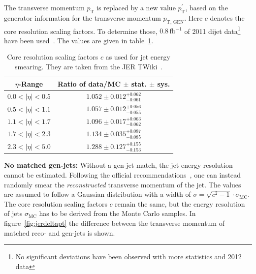 {\noindent The transverse momentum $p_{\text{T}}$ is replaced by a new value $p_{\text{T}}^\prime$, based on the generator information for the transverse momentum $p_{\text{T, GEN}}$. Here $c$ denotes the core resolution scaling factors. To determine those, $0.8\,\text{fb}^{-1}$ of 2011 dijet data\footnote{No significant deviations have been observed with more statistics and 2012 data} have been used~\cite{jer}. The values are given in table~\ref{tab:jerfactors}.

  \begin{table}[htbp!]
    \centering
    {\renewcommand{\arraystretch}{1.2}
      \begin{tabular}{|c|c|}
        \hline
        $\eta$-Range & Ratio of data/MC $\pm$ stat. $\pm$ sys. \\ \hline \hline
        $0.0 < |\eta| < 0.5$ & $1.052 \pm 0.012 ^{+0.062}_{-0.061}$ \\ \hline
        $0.5 < |\eta| < 1.1$ & $1.057 \pm 0.012 ^{+0.056}_{-0.055}$ \\ \hline
        $1.1 < |\eta| < 1.7$ & $1.096 \pm 0.017 ^{+0.063}_{-0.062}$ \\ \hline
        $1.7 < |\eta| < 2.3$ & $1.134 \pm 0.035 ^{+0.087}_{-0.085}$ \\ \hline
        $2.3 < |\eta| < 5.0$ & $1.288 \pm 0.127 ^{+0.155}_{-0.153}$ \\ \hline
      \end{tabular}
    }
    \caption{Core resolution scaling factors $c$ as used for jet energy smearing. They are taken from the JER TWiki~\cite{jer}.}
    \label{tab:jerfactors}
  \end{table}
  
\textbf{No matched gen-jets:} Without a gen-jet match, the jet energy resolution cannot be estimated. Following the official recommendations~\cite{jer}, one can instead randomly smear the \textit{reconstructed} transverse momentum of the jet. The values are assumed to follow a Gaussian distribution with a width of $\sigma = \sqrt{c^2-1} \cdot \sigma_{\text{MC}}$. The core resolution scaling factors $c$ remain the same, but the energy resolution of jets $\sigma_{\text{MC}}$ has to be derived from the Monte Carlo samples. In figure~\ref{fig:jerdeltapt} the difference between the transverse momentum of matched reco- and gen-jets is shown.

}
